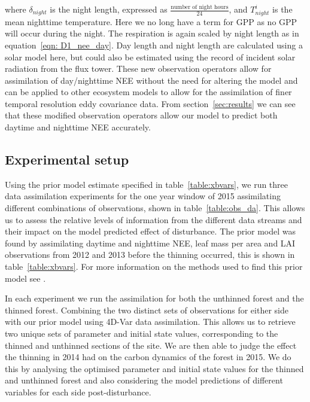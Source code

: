 \documentclass[draft,linenumbers]{agujournal}
\begin{document}
where \(\delta_{night}\) is the night length, expressed as \(\frac{\text{number of night hours}}{24}\), and \(T_{night}^{i}\) is the mean nighttime temperature. Here we no long have a term for GPP as no GPP will occur during the night. The respiration is again scaled by night length as in equation~\eqref{eqn: D1_nee_day}. Day length and night length are calculated using a solar model here, but could also be estimated using the record of incident solar radiation from the flux tower. These new observation operators allow for assimilation of day/nighttime NEE without the need for altering the model and can be applied to other ecosystem models to allow for the assimilation of finer temporal resolution eddy covariance data. From section~\ref{sec:results} we can see that these modified observation operators allow our model to predict both daytime and nighttime NEE accurately.


\subsection{Experimental setup}


Using the prior model estimate specified in table~\ref{table:xbvars}, we run three data assimilation experiments for the one year window of 2015 assimilating different combinations of observations, shown in table~\ref{table:obs_da}. This allows us to assess the relative levels of information from the different data streams and their impact on the model predicted effect of disturbance. The prior model was found by assimilating daytime and nighttime NEE, leaf mass per area and LAI observations from 2012 and 2013 before the thinning occurred, this is shown in table~\ref{table:xbvars}. For more information on the methods used to find this prior model see \citet{Pinnington2016299}.   

In each experiment we run the assimilation for both the unthinned forest and the thinned forest. Combining the two distinct sets of observations for either side with our prior model using 4D-Var data assimilation. This allows us to retrieve two unique sets of parameter and initial state values, corresponding to the thinned and unthinned sections of the site. We are then able to judge the effect the thinning in 2014 had on the carbon dynamics of the forest in 2015. We do this by analysing the optimised parameter and initial state values for the thinned and unthinned forest and also considering the model predictions of different variables for each side post-disturbance. 
\end{document}
